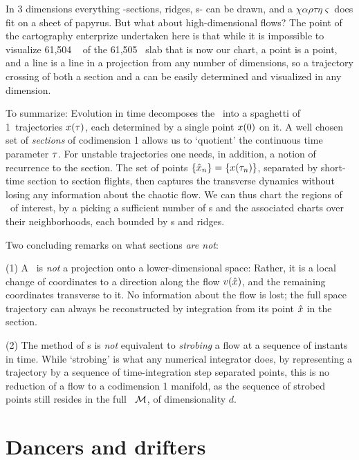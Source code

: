 \documentclass[aip,cha,reprint,
secnumarabic,
nofootinbib, tightenlines,
nobibnotes, showkeys, showpacs,
]{revtex4-1}
\begin{document}
In 3 dimensions everything -sections, ridges, \poincBord s- can be
drawn, and a $\chi\alpha\rho\tau\eta\varsigma$ does fit on a sheet of
papyrus. But what about high-dimensional flows? The point of the
cartography enterprize undertaken here is that while it is impossible to
visualize  61,504%
\dmn\ {\poincBord} of the 61,505%
\dmn\ slab that is now our chart, a point is a point,
and a line is a line in a projection from any number of dimensions, so a
trajectory crossing of both a section and a {\poincBord} can be easily
determined and visualized in any dimension.

To summarize:
Evolution in time decomposes the \statesp\ into a spaghetti of 1\dmn\
trajectories $x(\tau)$, each determined by a single point $x(0)$
on it. A well chosen set of \emph{sections} of codimension 1 allows us to
`quotient' the continuous time parameter $\tau$. For unstable
trajectories one needs, in addition, a notion of recurrence to the
section. The set of points $\{\hat{x}_n\} = \{x(\tau_n)\}$,  separated
by short-time section to section flights, then captures the transverse
dynamics without losing any information about the chaotic flow.
We can thus chart the regions of \statesp\ of interest, by a picking a
sufficient number of \template s and the associated charts over their
neighborhoods, each bounded by \poincBord s and ridges.

Two concluding remarks on what sections \emph{are not}:

(1) A \PoincSec\ is {\em not} a projection onto a
lower-dimensional space: Rather, it is a local change of coordinates to a
direction along the flow $v(\hat{x})$, and the remaining coordinates
transverse to it. No information about the flow is lost; the full space
trajectory can always be reconstructed by integration from its point
$\hat{x}$ in the section.

(2) The method of \PoincSec s is {\em not} equivalent to
\emph{strobing} a flow at a sequence of instants in time. While
`strobing' is what any numerical integrator does, by representing a
trajectory by a sequence of time-integration step separated points, this
is no reduction of a flow to a codimension 1 manifold, as the sequence of
strobed points still resides in the full \statesp\ ${\cal M}$, of
dimensionality $d$.


\section{Dancers and drifters}
\label{s:symm}
\end{document}
